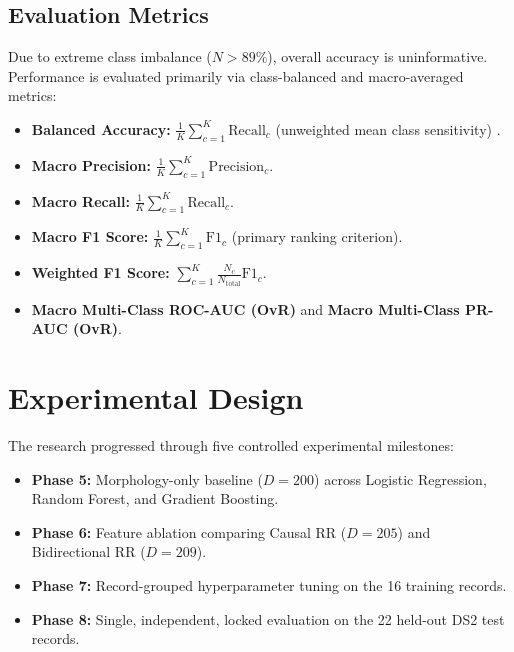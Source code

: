 \documentclass[conference]{IEEEtran}
\begin{document}
\subsection{Evaluation Metrics}
Due to extreme class imbalance ($N > 89\%$), overall accuracy is uninformative. Performance is evaluated primarily via class-balanced and macro-averaged metrics:
\begin{itemize}
    \item \textbf{Balanced Accuracy:} $\frac{1}{K} \sum_{c=1}^K \text{Recall}_c$ (unweighted mean class sensitivity) \cite{brodersen2010balanced}.
    \item \textbf{Macro Precision:} $\frac{1}{K} \sum_{c=1}^K \text{Precision}_c$.
    \item \textbf{Macro Recall:} $\frac{1}{K} \sum_{c=1}^K \text{Recall}_c$.
    \item \textbf{Macro F1 Score:} $\frac{1}{K} \sum_{c=1}^K \text{F1}_c$ (primary ranking criterion).
    \item \textbf{Weighted F1 Score:} $\sum_{c=1}^K \frac{N_c}{N_{\text{total}}} \text{F1}_c$.
    \item \textbf{Macro Multi-Class ROC-AUC (OvR)} and \textbf{Macro Multi-Class PR-AUC (OvR)}.
\end{itemize}

\section{Experimental Design}
The research progressed through five controlled experimental milestones:
\begin{itemize}
    \item \textbf{Phase 5:} Morphology-only baseline ($D=200$) across Logistic Regression, Random Forest, and Gradient Boosting.
    \item \textbf{Phase 6:} Feature ablation comparing Causal RR ($D=205$) and Bidirectional RR ($D=209$).
    \item \textbf{Phase 7:} Record-grouped hyperparameter tuning on the 16 training records.
    \item \textbf{Phase 8:} Single, independent, locked evaluation on the 22 held-out DS2 test records.
\end{itemize}
\end{document}
